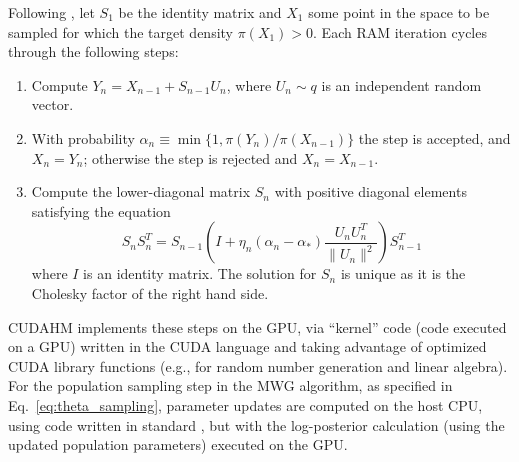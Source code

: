 Following \cite{vihola2012robust}, let $S_{1}$ be the identity matrix and $X_{1}$ some point in the space to be sampled for which the target density $\pi(X_{1})>0$.
Each RAM iteration cycles through the following steps: 
\begin{enumerate} \item Compute $Y_{n}=X_{n-1}+S_{n-1}U_{n}$, where $U_{n}\sim q$ is an independent random vector.
\item With probability $\alpha_{n} \equiv \min\{1,\pi(Y_{n})/\pi(X_{n-1})\}$ the step is accepted, and $X_{n}=Y_{n}$; otherwise the step is rejected and $X_{n}=X_{n-1}$.
\item Compute the lower-diagonal matrix $S_{n}$ with positive diagonal elements satisfying the equation
\begin{equation}
S_{n}S_{n}^{T}=S_{n-1}\left(I+\eta_{n}(\alpha_{n}-\alpha_{*})\frac{U_{n}U_{n}^{T}}{\parallel U_{n}\parallel^{2}}\right)S_{n-1}^{T}
\end{equation}
where $I$ is an identity matrix.
The solution for $S_{n}$ is unique as it is the Cholesky factor of the right hand side.
\end{enumerate}
CUDAHM implements these steps on the GPU, via ``kernel'' code (code executed on a GPU) written in the CUDA language and taking advantage of optimized CUDA library functions (e.g., for random number generation and linear algebra).
For the population sampling step in the MWG algorithm, as specified in Eq.~\ref{eq:theta_sampling}, parameter updates are computed on the host CPU, using code written in standard \Cpp, but with the log-posterior calculation (using the updated population parameters) executed on the GPU.





